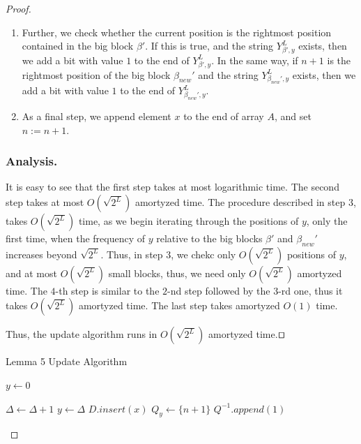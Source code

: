 \documentclass[runningheads]{llncs}
\begin{document}
\begin{proof}
\begin{enumerate}
        \item Further, we check whether the current position is the  rightmost position contained in 
        the big block $\beta'$. If this is true, and the string $Y_{\beta', y}^L$ exists, then we add a bit with value $1$ to the end of $Y_{\beta', y}^L$.
        In the same way, if $n+1$ is the rightmost position of the big block $\beta_{new}'$ and the string $Y_{\beta_{new}', y}^L$ exists, then we add a bit with value $1$ to the end of $Y_{\beta_{new}', y}^L$.
            
        \item As a final step, we append element $x$ to the end of array $A$, and set $n:=n+1$.
    \end{enumerate}

    \subsubsection{Analysis.}
    It is easy to see that the first step takes at most logarithmic time. The second step takes at most $O(\sqrt{2^L})$ amortyzed time.
    The procedure described in step $3$, takes $O(\sqrt{2^L})$ time, as we begin iterating through the positions of $y$, 
    only the first time, when the frequency of $y$ relative to the big blocks $\beta'$ and $\beta_{new}'$ increases beyond $\sqrt{2^L}$. 
    Thus, in step $3$, we chekc only $O(\sqrt{2^L})$ positions of $y$, and at most $O(\sqrt{2^L})$ small blocks, thus, we need only $O(\sqrt{2^L})$ amortyzed time.
    The $4$-th step is similar to the  $2$-nd step followed by the $3$-rd one, thus it takes $O(\sqrt{2^L})$ amortyzed time. The last step takes amortyzed $O(1)$ time.
    
    Thus, the update algorithm runs in $O(\sqrt{2^L})$ amortyzed time.$\qed$ 
    
    \begin{algorithm}[H]
        \caption{Lemma 5 Update Algorithm}\label{lemma5Update}
        \begin{algorithmic}[1]

        
        
        \State $y\gets 0$

        
        \State $\Delta\gets \Delta+1$
        \State $y\gets \Delta$
        \State $D.insert(x)$
        \State $Q_{y}\gets \{n+1\}$
        \State $Q^{-1}.append(1)$


\end{algorithmic}
\end{algorithm}
\end{proof}
\end{document}
